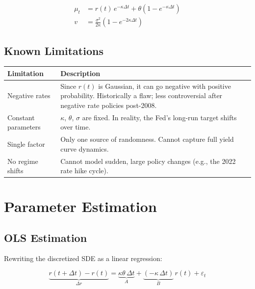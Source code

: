 \documentclass[11pt, letterpaper]{article}
\begin{document}
\begin{align}
  \mu_t &= r(t)\,e^{-\kappa\Delta t} + \theta\!\left(1 - e^{-\kappa\Delta t}\right) \\[4pt]
  v     &= \frac{\sigma^2}{2\kappa}\!\left(1 - e^{-2\kappa\Delta t}\right)
\end{align}

\subsection{Known Limitations}

\begin{center}
\begin{tabular}{@{}L{3.2cm}L{10cm}@{}}
  \toprule
  \textbf{Limitation} & \textbf{Description} \\
  \midrule
  Negative rates
    & Since $r(t)$ is Gaussian, it can go negative with positive probability.
      Historically a flaw; less controversial after negative rate policies post-2008. \\[4pt]
  Constant parameters
    & $\kappa$, $\theta$, $\sigma$ are fixed. In reality, the Fed's long-run
      target shifts over time. \\[4pt]
  Single factor
    & Only one source of randomness. Cannot capture full yield curve dynamics. \\[4pt]
  No regime shifts
    & Cannot model sudden, large policy changes (e.g., the 2022 rate hike cycle). \\
  \bottomrule
\end{tabular}
\end{center}

\section{Parameter Estimation}

\subsection{OLS Estimation}

Rewriting the discretized SDE as a linear regression:

\begin{equation}
  \underbrace{r(t+\Delta t) - r(t)}_{\Delta r}
    = \underbrace{\kappa\theta\,\Delta t}_{A}
      + \underbrace{(-\kappa\,\Delta t)}_{B}\,r(t) + \varepsilon_t
\end{equation}
\end{document}
